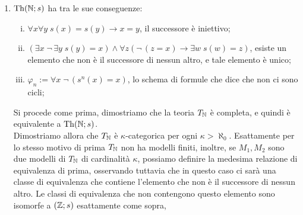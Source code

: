 \begin{soln}
\begin{enumerate}
\begin{align*}
                                   &= f^{-1}(s_M^{n+1}(a)) = f^{-1}(s_M(b))
        \end{align*}
        quindi ogni classe di equivalenza è una sottostruttura isomorfa a $(\ZZ;s)$. Per concludere basta osservare che poiché $M_1$ e $M_2$ sono unione disgiunta delle proprie classi di equivalenza vale che:
        \[ \kappa = |M_i| = \sum_{\{\text{classi di equivalenza in $M_i$}\}} \aleph_0 = \aleph_0 \cdot |\{\text{classi di equivalenza in $M_i$}\}| \]
        per cui sia $M_1$ che $M_2$ hanno $\kappa$ classi di equivalenza \textcolor{MidnightBlue}{- questo passaggio non funzionerebbe se $\kappa = \aleph_0$, in quanto l'equazione sopra avrebbe più cardinali possibili come soluzione}, e quindi sono isomorfi, perché basta comporre le mappe che portano dalla classi di equivalenza di $M_1$ a $\ZZ$ e da $\ZZ$ alle classi di equivalenza di $M_2$, e poi definire un'unica mappa incollandole.\footnote{Credo che sia proprio che entrambe le strutture sono isomorfe a $\coprod_{\kappa} (\ZZ;s)$, inteso come il coprodotto nella categoria delle $L$-strutture,
        infatti la mappa che stiamo costruendo è proprio quella data dalla sua proprietà universale.} 
        \item $\operatorname{Th}(\mathbb N;s)$ ha tra le sue conseguenze:
        \begin{enumerate}[(i)]
            \item $\forall x \forall y \; s(x) = s(y) \to x = y$, il successore è iniettivo;
            \item $(\exists x \; \neg\, \exists y \; s(y) = x) \land \forall z (\neg\, (z = x) \to \exists w \; s(w) = z)$, esiste un elemento che non è il successore di nessun altro, e tale elemento è unico;
            \item $\varphi_n := \forall x \; \neg\,(s^n(x) = x)$, lo schema di formule che dice che non ci sono cicli;
        \end{enumerate}
        Si procede come prima, dimostriamo che la teoria $T_{\mathbb N}$ è completa, e quindi è equivalente a $\operatorname{Th}(\mathbb N;s)$.\\
        Dimostriamo allora che $T_{\mathbb N}$ è $\kappa$-categorica per ogni $\kappa > \aleph_0$. Esattamente per lo stesso motivo di prima $T_\mathbb N$ non ha modelli finiti,
        inoltre, se $M_1, M_2$ sono due modelli di $T_\mathbb N$ di cardinalità $\kappa$, possiamo definire la medesima relazione di equivalenza di prima, osservando tuttavia che in questo caso
        ci sarà una classe di equivalenza che contiene l'elemento che non è il successore di nessun altro. Le classi di equivalenza che non contengono questo elemento sono isomorfe a $(\ZZ;s)$ esattamente come sopra,

\end{enumerate}
\end{soln}
